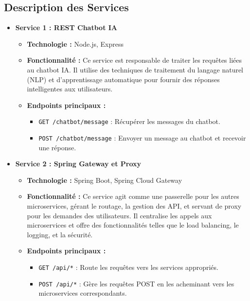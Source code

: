 \documentclass[a4paper, 11pt, openany]{report}
\begin{document}
\subsection{Description des Services}
\begin{itemize}
    \item \textbf{Service 1 : REST Chatbot IA}
    \begin{itemize}
        \item \textbf{Technologie :} Node.js, Express
        \item \textbf{Fonctionnalité :} Ce service est responsable de traiter les requêtes liées au chatbot IA. Il utilise des techniques de traitement du langage naturel (NLP) et d'apprentissage automatique pour fournir des réponses intelligentes aux utilisateurs.
        \item \textbf{Endpoints principaux :}
        \begin{itemize}
            \item \texttt{GET /chatbot/message} : Récupérer les messages du chatbot.
            \item \texttt{POST /chatbot/message} : Envoyer un message au chatbot et recevoir une réponse.
        \end{itemize}
    \end{itemize}
    
    \item \textbf{Service 2 : Spring Gateway et Proxy}
    \begin{itemize}
        \item \textbf{Technologie :} Spring Boot, Spring Cloud Gateway
        \item \textbf{Fonctionnalité :} Ce service agit comme une passerelle pour les autres microservices, gérant le routage, la gestion des API, et servant de proxy pour les demandes des utilisateurs. Il centralise les appels aux microservices et offre des fonctionnalités telles que le load balancing, le logging, et la sécurité.
        \item \textbf{Endpoints principaux :}
        \begin{itemize}
            \item \texttt{GET /api/*} : Route les requêtes vers les services appropriés.
            \item \texttt{POST /api/*} : Gère les requêtes POST en les acheminant vers les microservices correspondants.
        \end{itemize}
    \end{itemize}
    

\end{itemize}
\end{document}
